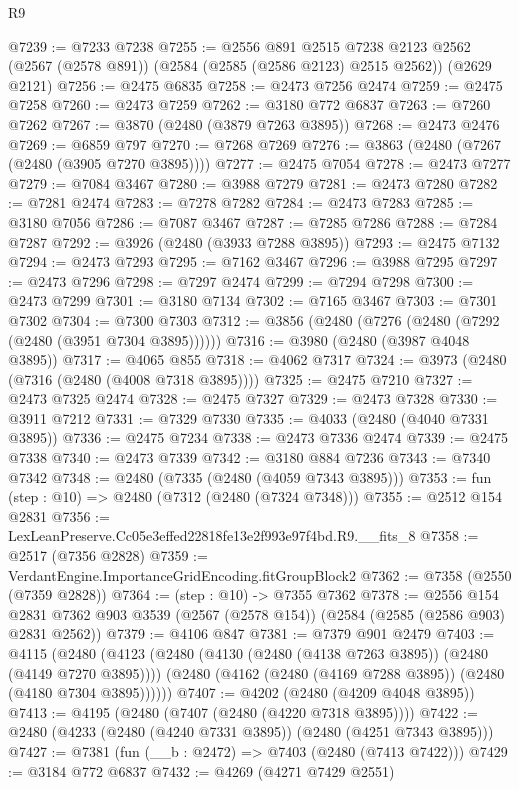 \begin{lexlean}{R9}
\begin{coremodule}
@7239 := @7233 @7238
@7255 := @2556
    @891
    @2515
    @7238
    @2123
    @2562
    (@2567 (@2578 @891))
    (@2584 (@2585 (@2586 @2123) @2515 @2562))
    (@2629 @2121)
@7256 := @2475 @6835
@7258 := @2473 @7256 @2474
@7259 := @2475 @7258
@7260 := @2473 @7259
@7262 := @3180 @772 @6837
@7263 := @7260 @7262
@7267 := @3870 (@2480 (@3879 @7263 @3895))
@7268 := @2473 @2476
@7269 := @6859 @797
@7270 := @7268 @7269
@7276 := @3863 (@2480 (@7267 (@2480 (@3905 @7270 @3895))))
@7277 := @2475 @7054
@7278 := @2473 @7277
@7279 := @7084 @3467
@7280 := @3988 @7279
@7281 := @2473 @7280
@7282 := @7281 @2474
@7283 := @7278 @7282
@7284 := @2473 @7283
@7285 := @3180 @7056
@7286 := @7087 @3467
@7287 := @7285 @7286
@7288 := @7284 @7287
@7292 := @3926 (@2480 (@3933 @7288 @3895))
@7293 := @2475 @7132
@7294 := @2473 @7293
@7295 := @7162 @3467
@7296 := @3988 @7295
@7297 := @2473 @7296
@7298 := @7297 @2474
@7299 := @7294 @7298
@7300 := @2473 @7299
@7301 := @3180 @7134
@7302 := @7165 @3467
@7303 := @7301 @7302
@7304 := @7300 @7303
@7312 := @3856 (@2480 (@7276 (@2480 (@7292 (@2480 (@3951 @7304 @3895))))))
@7316 := @3980 (@2480 (@3987 @4048 @3895))
@7317 := @4065 @855
@7318 := @4062 @7317
@7324 := @3973 (@2480 (@7316 (@2480 (@4008 @7318 @3895))))
@7325 := @2475 @7210
@7327 := @2473 @7325 @2474
@7328 := @2475 @7327
@7329 := @2473 @7328
@7330 := @3911 @7212
@7331 := @7329 @7330
@7335 := @4033 (@2480 (@4040 @7331 @3895))
@7336 := @2475 @7234
@7338 := @2473 @7336 @2474
@7339 := @2475 @7338
@7340 := @2473 @7339
@7342 := @3180 @884 @7236
@7343 := @7340 @7342
@7348 := @2480 (@7335 (@2480 (@4059 @7343 @3895)))
@7353 := fun (step : @10) => @2480 (@7312 (@2480 (@7324 @7348)))
@7355 := @2512 @154 @2831
@7356 := LexLeanPreserve.Cc05e3effed22818fe13e2f993e97f4bd.R9.__fits_8
@7358 := @2517 (@7356 @2828)
@7359 := VerdantEngine.ImportanceGridEncoding.fitGroupBlock2
@7362 := @7358 (@2550 (@7359 @2828))
@7364 := (step : @10) -> @7355 @7362
@7378 := @2556
    @154
    @2831
    @7362
    @903
    @3539
    (@2567 (@2578 @154))
    (@2584 (@2585 (@2586 @903) @2831 @2562))
@7379 := @4106 @847
@7381 := @7379 @901 @2479
@7403 := @4115
    (@2480
      (@4123
        (@2480 (@4130 (@2480 (@4138 @7263 @3895)) (@2480 (@4149 @7270 @3895))))
        (@2480 (@4162 (@2480 (@4169 @7288 @3895)) (@2480 (@4180 @7304 @3895))))))
@7407 := @4202 (@2480 (@4209 @4048 @3895))
@7413 := @4195 (@2480 (@7407 (@2480 (@4220 @7318 @3895))))
@7422 := @2480 (@4233 (@2480 (@4240 @7331 @3895)) (@2480 (@4251 @7343 @3895)))
@7427 := @7381 (fun (__b : @2472) => @7403 (@2480 (@7413 @7422)))
@7429 := @3184 @772 @6837
@7432 := @4269 (@4271 @7429 @2551)

\end{coremodule}
\end{lexlean}
